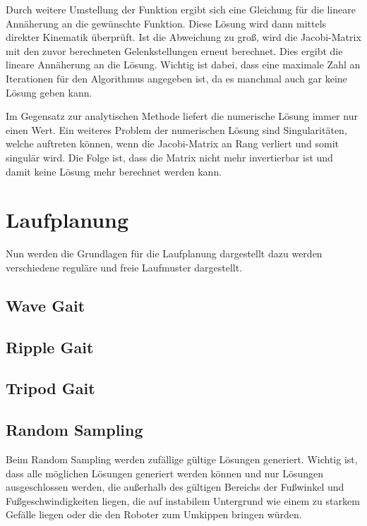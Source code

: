 Durch weitere Umstellung der Funktion ergibt sich eine Gleichung für die lineare Annäherung an die gewünschte Funktion. Diese Lösung wird dann mittels direkter Kinematik überprüft. Ist die Abweichung zu groß, wird die Jacobi-Matrix mit den zuvor berechneten Gelenkstellungen erneut berechnet. Dies ergibt die lineare Annäherung an die Lösung. Wichtig ist dabei, dass eine maximale Zahl an Iterationen für den Algorithmus angegeben ist, da es manchmal auch gar keine Lösung geben kann.

Im Gegensatz zur analytischen Methode liefert die numerische Lösung immer nur einen Wert. Ein weiteres Problem der numerischen Lösung sind Singularitäten, welche auftreten können, wenn die Jacobi-Matrix an Rang verliert und somit singulär wird. Die Folge ist, dass die Matrix nicht mehr invertierbar ist und damit keine Lösung mehr berechnet werden kann. 

\section{Laufplanung}

Nun werden die Grundlagen für die Laufplanung dargestellt dazu werden verschiedene reguläre und freie Laufmuster dargestellt.

\subsection{Wave Gait}

\subsection{Ripple Gait}

\subsection{Tripod Gait}

\subsection{Random Sampling}

Beim Random Sampling werden zufällige gültige Lösungen generiert. Wichtig ist, dass alle möglichen Lösungen generiert werden können und nur Lösungen ausgeschlossen werden, die außerhalb des gültigen Bereichs der Fußwinkel und Fußgeschwindigkeiten liegen, die auf instabilem Untergrund wie einem zu starkem Gefälle liegen oder die den Roboter zum Umkippen bringen würden.

